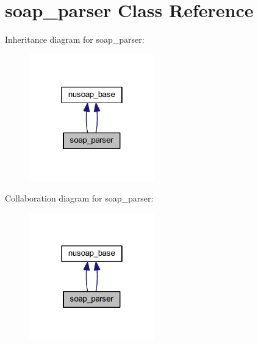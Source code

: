 \hypertarget{classsoap__parser}{\section{soap\-\_\-parser Class Reference}
\label{classsoap__parser}
}


Inheritance diagram for soap\-\_\-parser\-:
\nopagebreak
\begin{figure}[H]
\begin{center}
\leavevmode
\includegraphics[width=154pt]{classsoap__parser__inherit__graph}
\end{center}
\end{figure}


Collaboration diagram for soap\-\_\-parser\-:
\nopagebreak
\begin{figure}[H]
\begin{center}
\leavevmode
\includegraphics[width=154pt]{classsoap__parser__coll__graph}
\end{center}
\end{figure}
